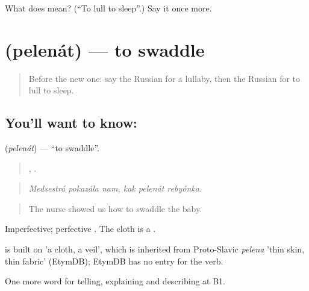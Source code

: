 \begin{tcolorbox}[breakable,colback=teal!4,colframe=teal!35!black,title={Before you move on}]
What does  mean? (\textquotedblleft{}To lull to sleep\textquotedblright{}.) Say it once more.
\end{tcolorbox}
\section[\texorpdfstring{\ru{пеленать} (pelenát)}{пеленать (pelenát)}]{ (pelenát) — to swaddle}

\label{lesson:RU-C496-pelenat}



\begin{quote}
Before the new one: say the Russian for a lullaby, then the Russian for to lull to sleep.
\end{quote}

\subsection*{You'll want to know: }
\textbf{} (\emph{pelenát}) — \textquotedblleft{}to swaddle\textquotedblright{}.

\begin{quote}
  ,   .
\end{quote}

\begin{quote}
\emph{Medsestrá pokazála nam, kak pelenát rebyónka.}
\end{quote}

\begin{quote}
The nurse showed us how to swaddle the baby.
\end{quote}

Imperfective; perfective . The cloth is a \emph{}.

\begin{cousinweb}
\emph{} is built on \emph{} 'a cloth, a veil', which is inherited from Proto-Slavic \emph{pelena} 'thin skin, thin fabric' (EtymDB); EtymDB has no entry for the verb.
\end{cousinweb}

\begin{grammarlens}[title={What you've built}]
One more word for telling, explaining and describing at B1.
\end{grammarlens}

